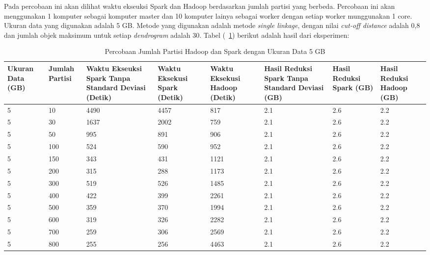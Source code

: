 

Pada percobaan ini akan dilihat waktu ekseuksi Spark dan Hadoop berdasarkan jumlah partisi yang berbeda. Percobaan ini akan menggunakan 1 komputer sebagai komputer master dan 10 komputer lainya sebagai worker dengan setiap worker munggunakan 1 core. Ukuran data yang digunakan adalah 5 GB. Metode yang digunakan adalah metode \textit{single linkage}, dengan nilai \textit{cut-off distance} adalah 0,8 dan jumlah objek maksimum untuk setiap \textit{dendrogram} adalah 30. Tabel (~\ref{tab:spark5}) berikut adalah hasil dari eksperimen:

\begin{table}[H] 
	\centering 
	\caption{Percobaan Jumlah Partisi Hadoop dan Spark dengan Ukuran Data 5 GB}
	\label{tab:spark5}
	\begin{tabular}{|p{1cm}|p{1cm}|p{2cm}|p{2cm}|p{2cm}|p{2cm}|p{2cm}|p{2cm}|}
\hline
Ukuran Data (GB) & Jumlah Partisi &  Waktu Ekseuksi Spark Tanpa Standard Deviasi (Detik) & Waktu Eksekusi Spark (Detik) & Waktu Eksekusi Hadoop (Detik) & Hasil Reduksi Spark Tanpa Standard Deviasi (GB) & Hasil Reduksi Spark (GB)  & Hasil Reduksi Hadoop (GB)\\ 
\hline
5  & 10 & 4490 & 4457 & 817 & 2.1 & 2.6 & 2.2\\
\hline
5  & 30 & 1637 & 2002 & 759 & 2.1 & 2.6 & 2.2\\
\hline
5  & 50 & 995 & 891 & 906 & 2.1 & 2.6 & 2.2 \\
\hline
5  & 100 & 524 & 590 & 952 & 2.1 & 2.6 & 2.2 \\
\hline
5  & 150 & 343 & 431 & 1121 & 2.1 & 2.6 & 2.2\\
\hline
5  & 200 & 315 & 288 & 1173 & 2.1 & 2.6 & 2.2\\
\hline
5  & 300 & 519 & 526 & 1485 & 2.1 & 2.6 & 2.2\\
\hline
5  & 400 & 422 & 399 & 2261 & 2.1 & 2.6 & 2.2 \\
\hline
5  & 500 & 359 & 370 & 1994 & 2.1 & 2.6 & 2.2\\
\hline
5  & 600 & 319 & 326 & 2282 & 2.1 & 2.6 & 2.2\\
\hline
5  & 700 & 259 & 306 & 2569 & 2.1 & 2.6 & 2.2\\
\hline
5  & 800 & 255 & 256 & 4463 & 2.1 & 2.6 & 2.2\\
\hline


\hline

	\end{tabular} 
\end{table}




